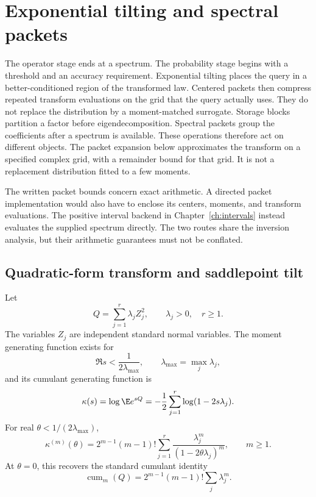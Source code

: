 \chapter{Exponential tilting and spectral packets}\label{ch:packets}
The operator stage ends at a spectrum. The probability stage begins with a
threshold and an accuracy requirement. Exponential tilting places the query
in a better-conditioned region of the transformed law. Centered packets then
compress repeated transform evaluations on the grid that the query actually
uses. They do not replace the distribution by a moment-matched surrogate.
\label{sec:packets}
Storage blocks partition a factor before eigendecomposition. Spectral packets group the coefficients after a spectrum is available. These operations therefore act on different objects. The packet expansion below approximates the transform on a specified complex grid, with a remainder bound for that grid. It is not a replacement distribution fitted to a few moments.

The written packet bounds concern exact arithmetic. A directed packet implementation would also have to enclose its centers, moments, and transform evaluations. The positive interval backend in Chapter~\ref{ch:intervals} instead evaluates the supplied spectrum directly. The two routes share the inversion analysis, but their arithmetic guarantees must not be conflated.

\section{Quadratic-form transform and saddlepoint tilt}

Let
\begin{equation}
Q=\sum_{j=1}^{r}\lambda_j Z_j^2,
\qquad \lambda_j>0,\quad r\ge1.
\label{eq:Q}
\end{equation}
The variables $Z_j$ are independent standard normal variables.
The moment generating function exists for
\[
\Re s < \frac{1}{2\lambda_{\max}},
\qquad
\lambda_{\max}=\max_j\lambda_j,
\]
and its cumulant generating function is
\begin{equation}
\kappa(s)=\log \E e^{sQ}
=-\frac12\sum_{j=1}^{r}\log(1-2s\lambda_j).
\label{eq:cgf}
\end{equation}
For real $\theta<1/(2\lambda_{\max})$,
\begin{equation}
\kappa^{(m)}(\theta)
=2^{m-1}(m-1)!\sum_{j=1}^{r}
\frac{\lambda_j^m}{(1-2\theta\lambda_j)^m},
\qquad m\ge1.
\label{eq:derivatives}
\end{equation}
At $\theta=0$, this recovers the standard cumulant identity
\[
\operatorname{cum}_m(Q)=2^{m-1}(m-1)!\sum_j\lambda_j^m.
\]


